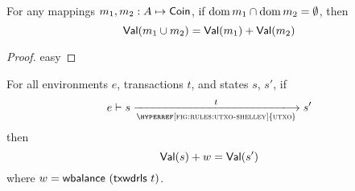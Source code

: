 \begin{lemma}
  \label{lemma:value-sum-pres-2}
  For any mappings $m_1, m_2:A\mapsto\mathsf{Coin}$,
  if $\operatorname{dom}{m_1}\cap\operatorname{dom}{m_2}=\emptyset$,
  then
  \begin{equation*}
    \mathsf{Val}(m_1\cup m_2) = \mathsf{Val}(m_1) + \mathsf{Val}(m_2)
  \end{equation*}
\end{lemma}
\begin{proof}
  easy
\end{proof}

\begin{lemma}
  \label{lemma:utxo-pres-of-value}
  For all environments $e$, transactions $t$, and states $s$, $s'$, if
  \begin{equation*}
    e\vdash s\trans{\hyperref[fig:rules:utxo-shelley]{utxo}}{t}s'
  \end{equation*}
  then
  \begin{equation*}
    \mathsf{Val}(s) + w = \mathsf{Val}(s')
  \end{equation*}
  where $w = \mathsf{wbalance}~(\mathsf{txwdrls}~{t})$.
\end{lemma}


